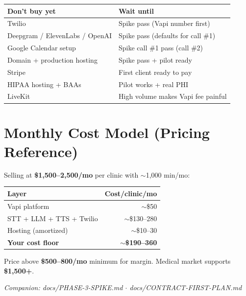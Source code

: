 \documentclass[11pt,a4paper]{article}
\begin{document}
\begin{center}
\small
\begin{tabular}{@{}ll@{}}
\toprule
\textbf{Don't buy yet} & \textbf{Wait until} \\
\midrule
Twilio & Spike pass (Vapi number first) \\
Deepgram / ElevenLabs / OpenAI & Spike pass (defaults for call \#1) \\
Google Calendar setup & Spike call \#1 pass (call \#2) \\
Domain + production hosting & Spike pass + pilot ready \\
Stripe & First client ready to pay \\
HIPAA hosting + BAAs & Pilot works + real PHI \\
LiveKit & High volume makes Vapi fee painful \\
\bottomrule
\end{tabular}
\end{center}

\section{Monthly Cost Model (Pricing Reference)}

Selling at \textbf{\$1,500--2,500/mo} per clinic with $\sim$1,000 min/mo:

\begin{center}
\begin{tabular}{@{}lr@{}}
\toprule
\textbf{Layer} & \textbf{Cost/clinic/mo} \\
\midrule
Vapi platform & $\sim$\$50 \\
STT + LLM + TTS + Twilio & $\sim$\$130--280 \\
Hosting (amortized) & $\sim$\$10--30 \\
\midrule
\textbf{Your cost floor} & \textbf{$\sim$\$190--360} \\
\bottomrule
\end{tabular}
\end{center}

Price above \textbf{\$500--800/mo} minimum for margin. Medical market supports \textbf{\$1,500+}.

\vfill
\begin{center}
\small
\textit{Companion: docs/PHASE-3-SPIKE.md $\cdot$ docs/CONTRACT-FIRST-PLAN.md}
\end{center}
\end{document}
